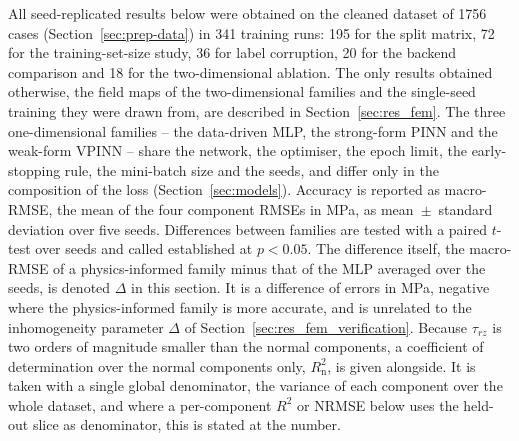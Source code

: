 \documentclass[subscriptcorrection,upint,varvw,barcolor=Goldenrod3,mathalfa=cal=euler,balance,hyphenate,french,pdf-a]{asmejour} %
\begin{document}
All seed-replicated results below were obtained on the cleaned dataset of 1756 cases (Section~\ref{sec:prep-data}) in 341 training runs: 195 for the split matrix, 72 for the training-set-size study, 36 for label corruption, 20 for the backend comparison and 18 for the two-dimensional ablation. The only results obtained otherwise, the field maps of the two-dimensional families and the single-seed training they were drawn from, are described in Section~\ref{sec:res_fem}. %
The three one-dimensional families -- the data-driven MLP, the strong-form PINN and the weak-form VPINN -- share the network, the optimiser, the epoch limit, the early-stopping rule, the mini-batch size and the seeds, and differ only in the composition of the loss (Section~\ref{sec:models}). Accuracy is reported as macro-RMSE, the mean of the four component RMSEs in MPa, as mean~$\pm$~standard deviation over five seeds. Differences between families are tested with a paired $t$-test over seeds \citep{demsar2006} and called established at $p<0.05$. The difference itself, the macro-RMSE of a physics-informed family minus that of the MLP averaged over the seeds, is denoted $\Delta$ in this section. It is a difference of errors in MPa, negative where the physics-informed family is more accurate, and is unrelated to the inhomogeneity parameter $\Delta$ of Section~\ref{sec:res_fem_verification}. Because $\tau_{rz}$ is two orders of magnitude smaller than the normal components, a coefficient of determination over the normal components only, $R^2_{\mathrm{n}}$, is given alongside. It is taken with a single global denominator, the variance of each component over the whole dataset, and where a per-component $R^2$ or NRMSE below uses the held-out slice as denominator, this is stated at the number. %
\end{document}
